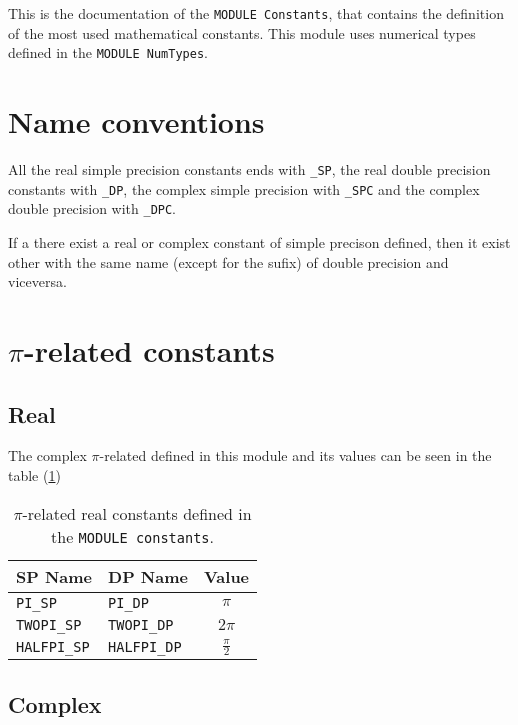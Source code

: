 This is the documentation of the \texttt{MODULE Constants}, that
contains the definition of the most used mathematical
constants. This module uses numerical types defined in the
\texttt{MODULE NumTypes}.

\section{Name conventions}

All the real simple precision constants ends with \texttt{\_SP}, the
real double precision constants with \texttt{\_DP}, the complex simple
precision with \texttt{\_SPC} and the complex double precision with
\texttt{\_DPC}. 

If a there exist a real or complex constant of simple precison defined,
then it exist other with the same name (except for the sufix) of
double precision and viceversa.

\section{$\pi$-related constants}


\subsection{Real}

The complex $\pi$-related defined in this module and its values can be
seen in the table (\ref{tab:picteR})

\begin{table}[htbp]
  \centering
  \begin{tabular}{|l|l|c|}
    \hline
    \textbf{SP Name} & \textbf{DP Name} & \textbf{Value} \\
    \hline
    \hline
    \texttt{PI\_SP} & \texttt{PI\_DP} & $\pi$ \\
    \hline
    \texttt{TWOPI\_SP} & \texttt{TWOPI\_DP} & $2\pi$ \\
    \hline
    \texttt{HALFPI\_SP} & \texttt{HALFPI\_DP} & $\frac{\pi}{2}$ \\
    \hline
  \end{tabular}
  \caption{$\pi$-related real constants defined in the \texttt{MODULE constants}.}
  \label{tab:picteR}
\end{table}



\subsection{Complex}

